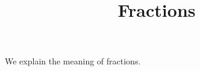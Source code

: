 \documentclass{ximera}
\title{Fractions}
\begin{document}
\begin{abstract}
\end{abstract}
\maketitle

We explain the meaning of fractions.
\end{document}
